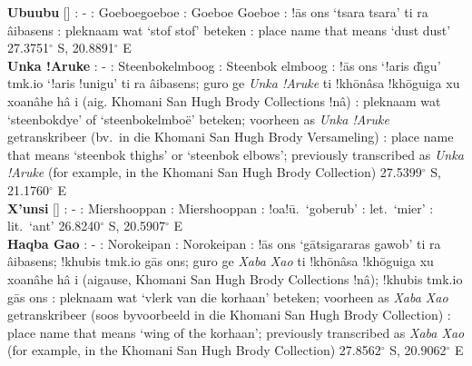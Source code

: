 \newpage

\textbf{\textvertline{}Ubu\textvertline{}ubu}
[] : -
: Goeboegoeboe : Goeboe Goeboe
: !\={a}s \textvertline{}ons `tsara tsara' ti ra
\textdoublebarpipe{}\^{a}ibasens : pleknaam wat `stof
stof' beteken : place name that means `dust dust'
27.3751$^{\circ}$ S, 20.8891$^{\circ}$ E \\

\textbf{\textvertline{}Unka !Aruke} : - :
Steenbokelmboog : Steenbok elmboog :
!\={a}s \textvertline{}ons `!aris d\^{\i}gu' tmk.io `!aris !unigu' ti
ra \textdoublebarpipe{}\^{a}ibasens; \textdoublebarpipe{}guro ge
\emph{\textvertline{}Unka !Aruke} ti
!kh\={o}\textdoublevertline{}n\^{a}sa
!kh\={o}\textdoublevertline{}guiga xu xoa\textdoublevertline{}n\^{a}he
h\^{a} i (ai\textdoublevertline{}g. \textdoublebarpipe{}Khomani San
Hugh Brody Collections !n\^{a}) : pleknaam wat
`steenbokdye' of `steenbokelmbo\"{e}' beteken; voorheen as
\emph{\textvertline{}Unka !Aruke} getranskribeer (bv.\ in die
\textdoublebarpipe{}Khomani San Hugh Brody Versameling)
: place name that means `steenbok thighs' or `steenbok
elbows'; previously transcribed as \emph{\textvertline{}Unka !Aruke}
(for example, in the \textdoublebarpipe{}Khomani San Hugh Brody
Collection) 27.5399$^{\circ}$ S, 21.1760$^{\circ}$ E \\

\textbf{\textvertline{}X'unsi} []
: - : Miershooppan :
Miershooppan : !oa!\={u}.\
`\textdoublebarpipe{}goberub' : let.\ `mier'
\underbar{Eng}: lit.\ `ant' 26.8240$^{\circ}$ S, 20.5907$^{\circ}$ E
\\

\textbf{\textdoublevertline{}Haqba \textdoublevertline{}Gao}
: - : Norokeipan :
Norokeipan \underbar{Nama}: !\={a}s \textvertline{}ons
`\textdoublevertline{}g\={a}tsi\textdoublevertline{}gararas
\textdoublevertline{}gawob' ti ra \textdoublebarpipe{}\^{a}ibasens;
!khubis tmk.io \textdoublebarpipe{}g\={a}s \textvertline{}ons;
\textdoublebarpipe{}guro ge \emph{\textdoublevertline{}Xaba
\textdoublevertline{}Xao} ti !kh\={o}\textdoublevertline{}n\^{a}sa
!kh\={o}\textdoublevertline{}guiga xu xoa\textdoublevertline{}n\^{a}he
h\^{a} i (ai\textdoublevertline{}gause, \textdoublebarpipe{}Khomani
San Hugh Brody Collections !n\^{a}); !khubis tmk.io
\textdoublebarpipe{}g\={a}s \textvertline{}ons :
pleknaam wat `vlerk van die korhaan' beteken; voorheen as
\emph{\textdoublevertline{}Xaba \textdoublevertline{}Xao}
getranskribeer (soos byvoorbeeld in die \textdoublebarpipe{}Khomani
San Hugh Brody Collection) \underbar{Eng}: place name that means `wing
of the korhaan'; previously transcribed as
\emph{\textdoublevertline{}Xaba \textdoublevertline{}Xao} (for
example, in the \textdoublebarpipe{}Khomani San Hugh Brody Collection)
27.8562$^{\circ}$ S, 20.9062$^{\circ}$ E \\

